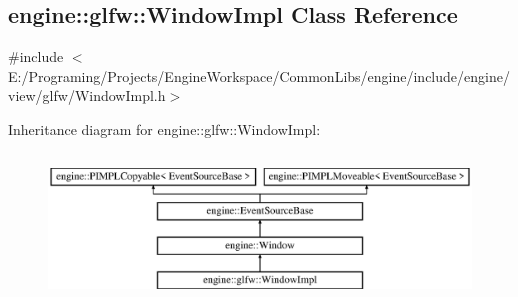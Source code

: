 \hypertarget{a00084}{}\subsection{engine\+:\+:glfw\+:\+:Window\+Impl Class Reference}
\label{a00084}


{\ttfamily \#include $<$E\+:/\+Programing/\+Projects/\+Engine\+Workspace/\+Common\+Libs/engine/include/engine/view/glfw/\+Window\+Impl.\+h$>$}

Inheritance diagram for engine\+:\+:glfw\+:\+:Window\+Impl\+:\begin{figure}[H]
\begin{center}
\leavevmode
\includegraphics[height=3.971631cm]{a00084}
\end{center}
\end{figure}
